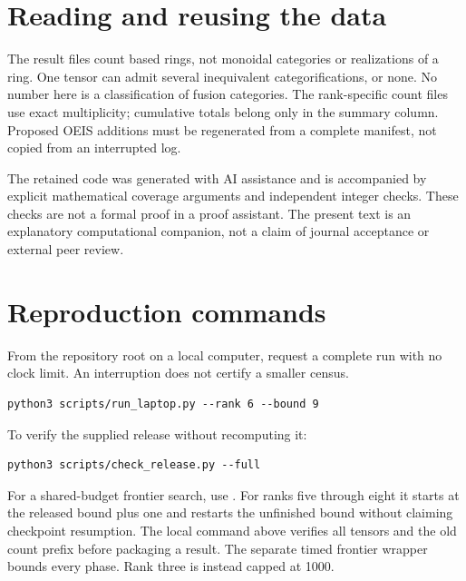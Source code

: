 \documentclass[11pt,a4paper]{article}
\theoremstyle{definition}\newtheorem{definition}[theorem]{Definition}\newtheorem{remark}[theorem]{Remark}
\begin{document}
\section{Reading and reusing the data}
The result files count based rings, not monoidal categories or realizations of
a ring. One tensor can admit several inequivalent categorifications, or none.
No number here is a classification of fusion categories. The rank-specific
count files use exact multiplicity; cumulative totals belong only in the
summary column. Proposed OEIS additions must be regenerated from a complete
manifest, not copied from an interrupted log.

The retained code was generated with AI assistance and is accompanied by explicit
mathematical coverage arguments and independent integer checks. These checks
are not a formal proof in a proof assistant. The present text is an explanatory
computational companion, not a claim of journal acceptance or external peer review.

\par\noindent\begin{minipage}{\linewidth}
\section{Reproduction commands}
From the repository root on a local computer, request a complete run with no clock limit. An interruption does not certify a smaller census.
\par\noindent\begin{minipage}{\linewidth}
\begin{lstlisting}
python3 scripts/run_laptop.py --rank 6 --bound 9
\end{lstlisting}
\end{minipage}\par
To verify the supplied release without recomputing it:
\par\noindent\begin{minipage}{\linewidth}
\begin{lstlisting}
python3 scripts/check_release.py --full
\end{lstlisting}
\end{minipage}\par
For a shared-budget frontier search, use . For ranks five through eight it starts at the released bound plus one and restarts the unfinished bound without claiming checkpoint resumption. The local command above verifies all tensors and the old count prefix before packaging a result. The separate timed frontier wrapper bounds every phase. Rank three is instead capped at 1000.

\end{minipage}\par
\end{document}
